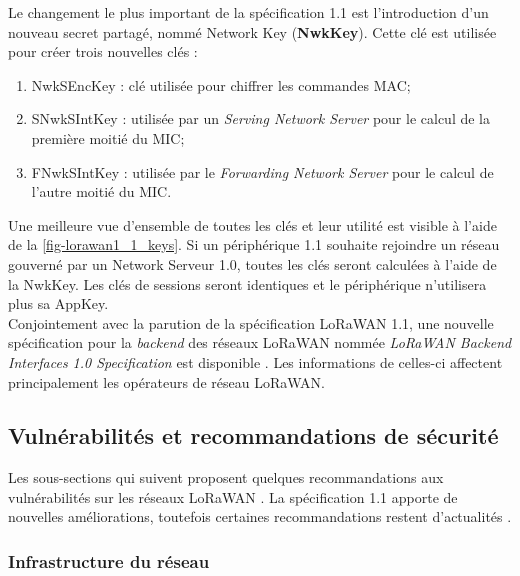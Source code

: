 Le changement le plus important de la spécification 1.1 est l'introduction d'un nouveau secret partagé, nommé Network Key (\textbf{NwkKey}). Cette clé est utilisée pour créer trois nouvelles clés : 
\begin{enumerate}
    \item NwkSEncKey : clé utilisée pour chiffrer les commandes MAC;
    \item SNwkSIntKey : utilisée par un \textit{Serving Network Server} pour le calcul de la première moitié du MIC;
    \item FNwkSIntKey : utilisée par le \textit{Forwarding Network Server} pour le calcul de l'autre moitié du MIC.
\end{enumerate}

Une meilleure vue d'ensemble de toutes les clés et leur utilité est visible à l'aide de la \cref{fig-lorawan1_1_keys}. Si un périphérique 1.1 souhaite rejoindre un réseau gouverné par un Network Serveur 1.0, toutes les clés seront calculées à l'aide de la NwkKey. Les clés de sessions seront identiques et le périphérique n'utilisera plus sa AppKey. \\


Conjointement avec la parution de la spécification LoRaWAN 1.1, une nouvelle spécification pour la \textit{backend} des réseaux LoRaWAN nommée \textit{LoRaWAN Backend Interfaces 1.0 Specification} est disponible \cite{loraalli46:online}. Les informations de celles-ci affectent principalement les opérateurs de réseau LoRaWAN.

\subsection{Vulnérabilités et recommandations de sécurité}
\label{sec-security_lorawan_recommendatiions}

Les sous-sections qui suivent proposent quelques recommandations aux vulnérabilités sur les réseaux LoRaWAN \cite{ttnvideos_security:online} \cite{LoRaSecu3:online}. La spécification 1.1 apporte de nouvelles améliorations, toutefois certaines recommandations restent d'actualités \cite{lorawan1_1_video:online}.  

\subsubsection{Infrastructure du réseau}

